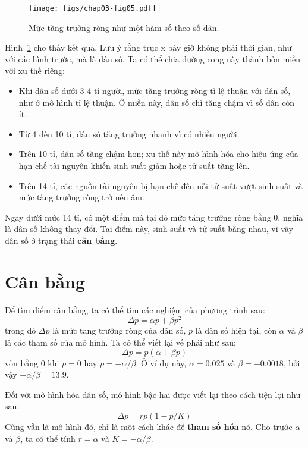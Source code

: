 \documentclass[12pt]{book}
\theoremstyle{exercise}
\begin{document}
\begin{figure}
\centerline{\texttt{[image: figs/chap03-fig05.pdf]}}
\caption{Mức tăng trưởng ròng như một hàm số theo số dân.}
\label{chap03-fig05}
\end{figure}

Hình~\ref{chap03-fig05} cho thấy kết quả. Lưu ý rằng trục x bây giờ không phải thời gian, như với các hình trước, mà là dân số. Ta có thể chia đường cong này thành bốn miền với xu thế riêng:

\begin{itemize}

\item Khi dân số dưới 3-4 tỉ người, mức tăng trưởng ròng tỉ lệ thuận với dân số, như ở mô hình tỉ lệ thuận. Ở miền này, dân số chỉ tăng chậm vì số dân còn ít.

\item Từ 4 đến 10 tỉ, dân số tăng trưởng nhanh vì có nhiều người.

\item Trên 10 tỉ, dân số tăng chậm hơn; xu thế này mô hình hóa cho hiệu ứng của hạn chế tài nguyên khiến sinh suất giảm hoặc tử suất tăng lên.

\item Trên 14 tỉ, các nguồn tài nguyên bị hạn chế đến nỗi tử suất vượt sinh suất và mức tăng trưởng ròng trở nên âm.

\end{itemize}

Ngay dưới mức 14 tỉ, có một điểm mà tại đó mức tăng trưởng ròng bằng 0, nghĩa là dân số không thay đổi. Tại điểm này, sinh suất và tử suất bằng nhau, vì vậy dân số ở trạng thái {\bf cân bằng}.



\section{Cân bằng}
\label{equilibrium}

Để tìm điểm cân bằng, ta có thể tìm các nghiệm của phương trình sau:
%
\[ \Delta p = \alpha p + \beta p^2 \]
%
trong đó $\Delta p$ là mức tăng trưởng ròng của dân số, $p$ là đân số hiện tại, còn $\alpha$ và $\beta$ là các tham số của mô hình. Ta có thể viết lại vế phải như sau:
%
\[ \Delta p = p (\alpha + \beta p) \]
%
vốn bằng $0$ khi $p=0$ hay $p=-\alpha/\beta$.  Ở ví dụ này, $\alpha = 0.025$ và $\beta = -0.0018$, bởi vậy $-\alpha/\beta = 13.9$.

Đối với mô hình hóa dân số, mô hình bậc hai được viết lại theo cách tiện lợi như sau:
%
\[ \Delta p = r p (1 - p / K) \]
%
Cũng vẫn là mô hình đó, chỉ là một cách khác để {\bf tham số hóa} nó. Cho trước $\alpha$ và $\beta$, ta có thể tính $r=\alpha$ và $K=-\alpha/\beta$.
\end{document}
